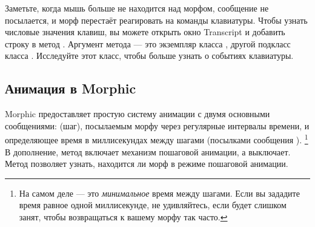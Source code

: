 \documentclass[a4paper,10pt,twoside]{book}
\begin{document}
Заметьте, когда мышь больше не находится над морфом, сообщение  не посылается, и морф перестаёт реагировать на команды клавиатуры.
Чтобы узнать числовые значения клавиш, вы можете открыть окно Transcript и добавить строку   в метод .
Аргумент  метода  --- это экземпляр класса , другой подкласс класса . Исследуйте этот класс, чтобы больше узнать о событиях клавиатуры.

\subsection{Анимация в Morphic}

Morphic предоставляет простую систему анимации с двумя основными сообщениями:  (шаг), посылаемым морфу через регулярные интервалы времени, и  определяющее время в миллисекундах между шагами (посылками сообщения ). \footnote{На самом деле  --- это \emph{минимальное} время между шагами.   Если вы зададите время  равное одной миллисекунде, не удивляйтесь, если \pharo будет слишком занят, чтобы возвращаться к вашему морфу так часто.}
В дополнение,
метод  включает механизм пошаговой анимации, а  выключает. Метод  позволяет узнать, находится ли морф в режиме пошаговой анимации.
\end{document}

